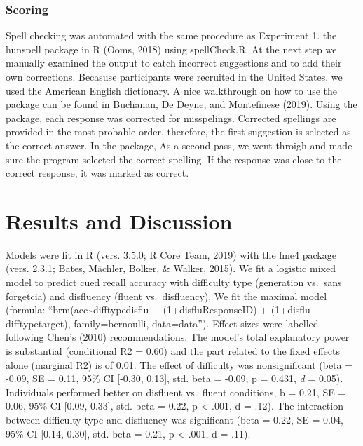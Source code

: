 \documentclass[english,doc]{apa6}
\begin{document}
\hypertarget{scoring}{%
\subsubsection{Scoring}\label{scoring}}

Spell checking was automated with the same procedure as Experiment 1. the hunspell package in R (Ooms, 2018) using spellCheck.R. At the next step we manually examined the output to catch incorrect suggestions and to add their own corrections. Becasuse participants were recruited in the United States, we used the American English dictionary. A nice walkthrough on how to use the package can be found in Buchanan, De Deyne, and Montefinese (2019). Using the package, each response was corrected for misspelings. Corrected spellings are provided in the most probable order, therefore, the first suggestion is selected as the correct answer. In the package, As a second pass, we went throigh and made sure the program selected the correct spelling. If the response was close to the correct response, it was marked as correct.

\hypertarget{results-and-discussion}{%
\section{Results and Discussion}\label{results-and-discussion}}

Models were fit in R (vers. 3.5.0; R Core Team, 2019) with the lme4 package (vers. 2.3.1; Bates, Mächler, Bolker, \& Walker, 2015). We fit a logistic mixed model to predict cued recall accuracy with difficulty type (generation vs.~sans forgetcia) and disfluency (fluent vs.~disfluency). We fit the maximal model (formula: \enquote{brm(acc\textasciitilde{}difftypedisflu + (1+disflu\textbar{}ResponseID) + (1+disflu difftype\textbar{}target), family=bernoulli, data=data}). Effect sizes were labelled following Chen's (2010) recommendations. The model's total explanatory power is substantial (conditional R2 = 0.60) and the part related to the fixed effects alone (marginal R2) is of 0.01. The effect of difficulty was nonsignificant (beta = -0.09, SE = 0.11, 95\% CI {[}-0.30, 0.13{]}, std. beta = -0.09, p = 0.431, \emph{d} = 0.05). Individuals performed better on disfluent vs.~fluent conditions, b = 0.21, SE = 0.06, 95\% CI {[}0.09, 0.33{]}, std. beta = 0.22, p \textless{} .001, d = .12). The interaction between difficulty type and disfluency was significant (beta = 0.22, SE = 0.04, 95\% CI {[}0.14, 0.30{]}, std. beta = 0.21, p \textless{} .001, d = .11).
\end{document}
